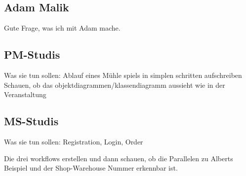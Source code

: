 \subsection{Adam Malik}\label{subsec:adam-malik}
Gute Frage, was ich mit Adam mache.

\subsection{PM-Studis}\label{subsec:pm-studis}
Was sie tun sollen:
Ablauf eines Mühle spiels in simplen schritten aufschreiben
Schauen, ob das objektdiagrammen/klassendiagramm aussieht wie in der Veranstaltung

\subsection{MS-Studis}\label{subsec:ms-studis}
Was sie tun sollen:
Registration, Login, Order

Die drei workflows erstellen und dann schauen, ob die Parallelen zu Alberts Beispiel und der
Shop-Warehouse Nummer erkennbar ist.
